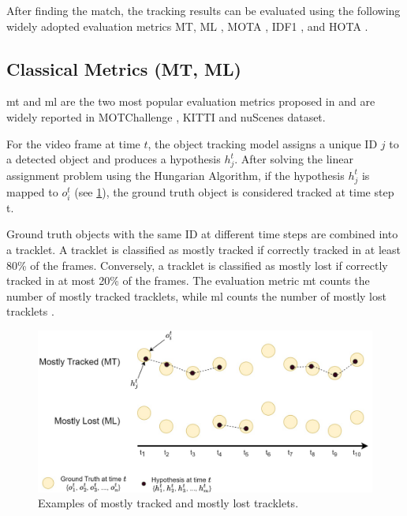 After finding the match, the tracking results can be evaluated using the following widely adopted evaluation metrics MT, ML \citep{wu2006tracking}, MOTA \citep{bernardin2008evaluating}, IDF1 \citep{ristani2016performance}, and HOTA \citep{luiten2021hota}.

\subsection{Classical Metrics (MT, ML)}

\acrfull{mt} and \acrfull{ml} are the two most popular evaluation metrics proposed in \citep{wu2006tracking} and are widely reported in MOTChallenge \citep{dendorfer2020mot20}, KITTI \citep{Geiger2012CVPR} and nuScenes \citep{caesar2020nuscenes} dataset.

For the video frame at time $t$, the object tracking model assigns a unique ID $j$ to a detected object and produces a hypothesis $h_j^t$. After solving the linear assignment problem using the Hungarian Algorithm, if the hypothesis $h_j^t$ is mapped to $o_i^t$ (see \ref{fig:mt_ml}), the ground truth object is considered tracked at time step t.

Ground truth objects with the same ID at different time steps are combined into a tracklet. A tracklet is classified as mostly tracked if correctly tracked in at least 80\% of the frames. Conversely, a tracklet is classified as mostly lost if correctly tracked in at most 20\% of the frames. The evaluation metric \acrshort{mt} counts the number of mostly tracked tracklets, while \acrshort{ml} counts the number of mostly lost tracklets \citep{wu2006tracking}.

\begin{figure}[H]
    \centering
    \includegraphics[width=\linewidth]{figures/chapter_tracking/MT_ML.jpg}
  \caption{Examples of mostly tracked and mostly lost tracklets.}
  \label{fig:mt_ml}
\end{figure}


